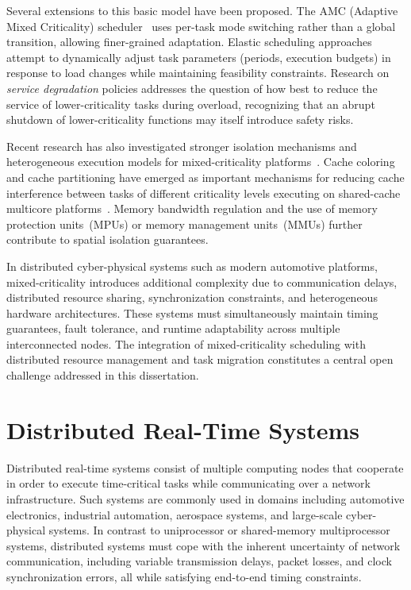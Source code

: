 Several extensions to this basic model have been proposed.
The AMC (Adaptive Mixed Criticality) scheduler~\cite{burns2013}
uses per-task mode switching rather than a global transition,
allowing finer-grained adaptation. Elastic scheduling
approaches attempt to dynamically adjust task parameters
(periods, execution budgets) in response to load changes
while maintaining feasibility constraints. Research on
\emph{service degradation} policies addresses the question of
how best to reduce the service of lower-criticality tasks
during overload, recognizing that an abrupt shutdown of
lower-criticality functions may itself introduce safety risks.

Recent research has also investigated stronger isolation
mechanisms and heterogeneous execution models for
mixed-criticality platforms~\cite{hoornaert2024,tinto2024}.
Cache coloring and cache partitioning have emerged as
important mechanisms for reducing cache interference between
tasks of different criticality levels executing on shared-cache
multicore platforms~\cite{mancuso2013}. Memory bandwidth
regulation and the use of memory protection units~(MPUs) or
memory management units~(MMUs) further contribute to
spatial isolation guarantees.

In distributed cyber-physical systems such as modern
automotive platforms, mixed-criticality introduces additional
complexity due to communication delays, distributed resource
sharing, synchronization constraints, and heterogeneous
hardware architectures. These systems must simultaneously
maintain timing guarantees, fault tolerance, and runtime
adaptability across multiple interconnected nodes. The
integration of mixed-criticality scheduling with distributed
resource management and task migration constitutes a central
open challenge addressed in this dissertation.

\section{Distributed Real-Time Systems}
\label{sec:distributed}

Distributed real-time systems consist of multiple computing
nodes that cooperate in order to execute time-critical tasks
while communicating over a network infrastructure. Such
systems are commonly used in domains including automotive
electronics, industrial automation, aerospace systems, and
large-scale cyber-physical systems. In contrast to
uniprocessor or shared-memory multiprocessor systems,
distributed systems must cope with the inherent uncertainty
of network communication, including variable transmission
delays, packet losses, and clock synchronization errors,
all while satisfying end-to-end timing constraints.


